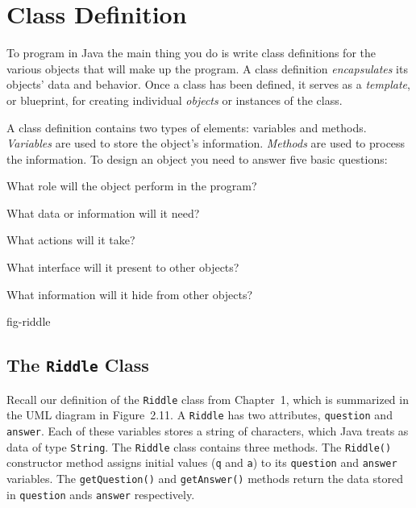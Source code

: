 \section{Class Definition}
\label{sec-classdef}

\noindent To program in Java the main thing you do is write class definitions
for the various objects that will make up the program.  A class
definition {\it encapsulates} its objects' data and behavior.  Once a
class has been defined, it serves as a {\it template}, or blueprint,
for creating individual {\it objects} or instances of the class.

A class definition contains two types of elements: variables and
methods.  {\it Variables} are used to store the
object's information.  {\it Methods} are used to process the
information.  To design an object you need to answer five basic
questions:

\begin{minipage}[t]{26pc}
\begin{NL}
\item  What role will the object perform in the program?
\item  What data or information will it need?
\item  What actions will it take?
\item  What interface will it present to other objects?
\item  What information will it hide from other objects?
\end{NL}
\end{minipage}

{fig-riddle}
\subsection{The {\tt Riddle} Class}

\noindent Recall our definition of the {\tt Riddle} class from
Chapter~1, which is summarized in the UML diagram in Figure~2.11. A
{\tt Riddle} has two attributes, {\tt question} and {\tt answer}. Each
of these variables stores a string of characters, which Java treats as
data of type {\tt String}.  The {\tt Riddle} class contains three
methods.  The {\tt Riddle()} constructor method assigns initial values
({\tt q} and {\tt a}) to its {\tt question} and {\tt answer}
variables.  The {\tt getQuestion()} and {\tt getAnswer()} methods
return the data stored in {\tt question} ands {\tt answer}
respectively.


